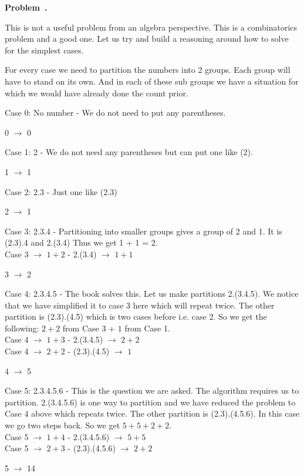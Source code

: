 \documentclass[10pt]{article}
\newcounter{problem}
\newenvironment{problem}[1][]{
  \refstepcounter{problem}
  \par\noindent\textbf{Problem~\theproblem. #1}\par
  \vspace{0.5em}
}{\vspace{1em}}
\begin{document}
\begin{problem} %
This is not a useful problem from an algebra perspective. This is a combinatorics problem and a good one. Let us try and build a reasoning around how to solve for the simplest cases. 

For every case we need to partition the numbers into 2 groups. Each group will have to stand on
its own. And in each of these sub groups we have a situation for which we would have already done the count prior.

Case 0: No number - We do not need to put any parentheses.
\begin{center}
0 $\rightarrow$ 0 
\end{center}

Case 1: 2 - We do not need any parentheses but can put one like (2).
\begin{center}
1 $\rightarrow$ 1 
\end{center}

Case 2: 2.3 - Just one like (2.3)
\begin{center}
2 $\rightarrow$ 1 
\end{center}

Case 3: 2.3.4 - Partitioning into smaller groups gives a group of 2 and 1. It is (2.3).4 and 2.(3.4)
Thus we get 1 + 1 = 2.\\
Case 3 $\rightarrow$ $1 + 2$ - 2.(3.4) $\rightarrow$ $1 + 1$\\
\begin{center}
3 $\rightarrow$ 2 
\end{center}

Case 4: 2.3.4.5 - The book solves this. Let us make partitions 2.(3.4.5). We notice that we have
simplified it to case 3 here which will repeat twice. The other partition is (2.3).(4.5) which is
two cases before i.e. case 2. So we get the following:
$2 + 2$ from Case 3 + $1$ from Case 1.\\
Case 4 $\rightarrow$ $1 + 3$ - 2.(3.4.5) $\rightarrow$ $2 + 2$\\
Case 4 $\rightarrow$ $2 + 2$ - (2.3).(4.5) $\rightarrow$ $1$\\
\begin{center}
4 $\rightarrow$ 5 
\end{center}

Case 5: 2.3.4.5.6 - This is the question we are asked. The algorithm requires us to partition.
2.(3.4.5.6) is one way to partition and we have reduced the problem to Case 4 above which repeats 
twice. The other partition is (2.3).(4.5.6). In this case we go two steps back.
So we get $5 + 5 + 2 + 2$.\\
Case 5 $\rightarrow$ $1 + 4$ - 2.(3.4.5.6) $\rightarrow$ $5 + 5$\\
Case 5 $\rightarrow$ $2 + 3$ - (2.3).(4.5.6) $\rightarrow$ $2 + 2$\\
\begin{center}
5 $\rightarrow$ 14
\end{center}


\end{problem}
\end{document}
